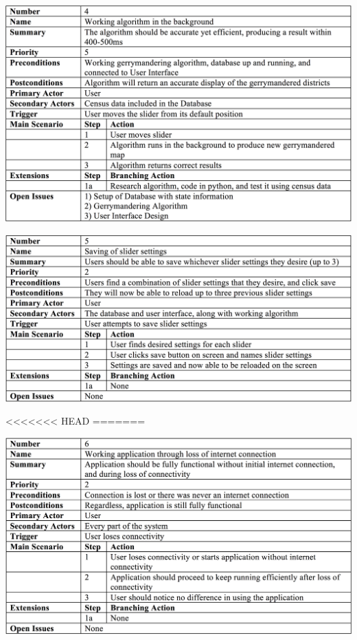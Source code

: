 \documentclass{article}
\begin{document}
\begin{addmargin}[4em]{0em}
\begin{center}
\hspace*{-2cm}      
\includegraphics[scale=.25]{Algorithm.png}
\end{center}

\begin{center}
\hspace*{-2cm}      
\includegraphics[scale=.25]{Saving.png}
\end{center}
<<<<<<< HEAD
=======

\begin{center}
\hspace*{-2cm}      
\includegraphics[scale=.25]{LossOfNetwork.png}
\end{center}


\end{addmargin}
\end{document}
